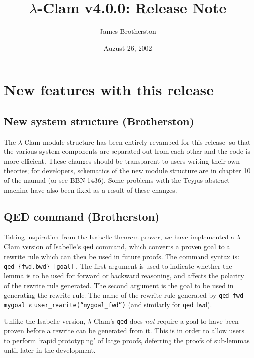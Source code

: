 \documentclass[11pt]{article}
\begin{document}
\title{$\lambda$-Clam v4.0.0: Release Note} 

\author{James Brotherston}

\date{August 26, 2002}

\maketitle

\section{New features with this release}

\subsection{New system structure (Brotherston)}

The $\lambda$-Clam module structure has been entirely revamped for
this release, so that the various system components are separated out
from each other and the code is more efficient.  These changes should
be transparent to users writing their own theories; for developers,
schematics of the new module structure are in chapter 10 of the manual
(or see BBN 1436).  Some problems with the Teyjus abstract machine
have also been fixed as a result of these changes.

\subsection{QED command (Brotherston)}
Taking inspiration from the Isabelle theorem prover, we have
implemented a $\lambda$-Clam version of Isabelle's {\tt qed} command, which
converts a proven goal to a rewrite rule which can then be used in
future proofs.  The command syntax is: {\tt qed \{fwd,bwd\} [goal].}
The first argument is used to indicate whether the lemma is to be used
for forward or backward reasoning, and affects the polarity of the
rewrite rule generated.  The second argument is the goal to be used in
generating the rewrite rule.  The name of the rewrite rule generated
by {\tt qed fwd mygoal} is {\tt user\_rewrite(``mygoal\_fwd'')} (and
similarly for {\tt qed bwd}).

Unlike the Isabelle version, $\lambda$-Clam's {\tt qed} does \emph{not}
require a goal to have been proven before a rewrite can be generated
from it.  This is in order to allow users to perform `rapid
prototyping' of large proofs, deferring the proofs of sub-lemmas until
later in the development.
\end{document}
